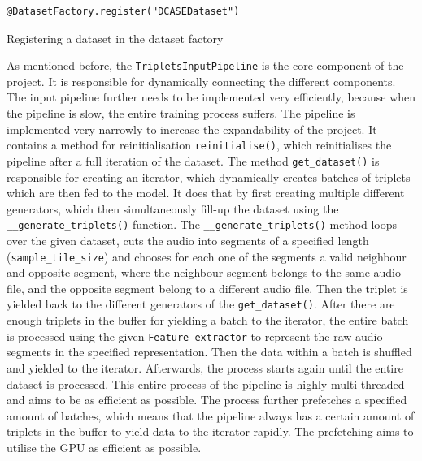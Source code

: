 \begin{code}[htbp]
\begin{verbatim}
@DatasetFactory.register("DCASEDataset")
\end{verbatim}
\caption{Registering a dataset in the dataset factory}
\label{code:Dataset-Factory}
\end{code}
\noindent
As mentioned before, the \texttt{TripletsInputPipeline} is the core component of the project. It is responsible for dynamically connecting the different components. The input pipeline further needs to be implemented very efficiently, because when the pipeline is slow, the entire training process suffers. The pipeline is implemented very narrowly to increase the expandability of the project. It contains a method for reinitialisation \texttt{reinitialise()}, which reinitialises the pipeline after a full iteration of the dataset.
\newline
\newline
The method \texttt{get\_dataset()} is responsible for creating an iterator, which dynamically creates batches of triplets which are then fed to the model. It does that by first creating multiple different generators, which then simultaneously fill-up the dataset using the \texttt{\_\_generate\_triplets()} function. The \texttt{\_\_generate\_triplets()} method loops over the given dataset, cuts the audio into segments of a specified length (\texttt{sample\_tile\_size}) and chooses for each one of the segments a valid neighbour and opposite segment, where the neighbour segment belongs to the same audio file, and the opposite segment belong to a different audio file. Then the triplet is yielded back to the different generators of the \texttt{get\_dataset()}. After there are enough triplets in the buffer for yielding a batch to the iterator, the entire batch is processed using the given \texttt{Feature extractor} to represent the raw audio segments in the specified representation. Then the data within a batch is shuffled and yielded to the iterator. Afterwards, the process starts again until the entire dataset is processed. 
\newline
\newline
This entire process of the pipeline is highly multi-threaded and aims to be as efficient as possible. The process further prefetches a specified amount of batches, which means that the pipeline always has a certain amount of triplets in the buffer to yield data to the iterator rapidly. The prefetching aims to utilise the \gls{GPU} as efficient as possible.

